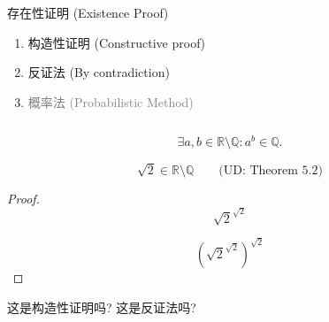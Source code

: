 \begin{frame}{}
  \begin{exampleblock}{存在性证明 (Existence Proof)}
    \begin{enumerate}
      \item 构造性证明 (Constructive proof)
      \item 反证法 (By contradiction)
	\pause
      \item \textcolor{gray}{概率法 (Probabilistic Method)}
    \end{enumerate}
  \end{exampleblock}

  \begin{columns}
      \pause
  \end{columns}
\end{frame}

\begin{frame}{}
  \begin{theorem}
    \[
      \exists a, b \in \mathbb{R} \setminus \mathbb{Q}: a^{b} \in \mathbb{Q}.
    \]
  \end{theorem}

  \pause
  \[
    \sqrt{2} \in \mathbb{R} \setminus \mathbb{Q} \qquad \text{(UD: Theorem 5.2)}
  \]

  \pause
  \begin{proof}
    \[
      \sqrt{2}^{\sqrt{2}}
    \]

    \pause
    \[
      (\sqrt{2}^{\sqrt{2}})^{\sqrt{2}}
    \]
  \end{proof}

  \vspace{0.50cm}
  \pause
  \centerline{ 这是构造性证明吗? \pause 这是反证法吗?}
\end{frame}
